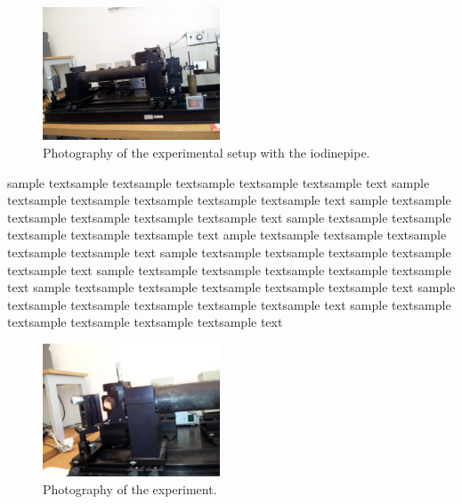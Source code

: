 \begin{figure}
  \begin{center}
    \includegraphics[width=0.47\textwidth]{pics/const2}
  \end{center}
\caption{Photography of the experimental setup with the
    iodinepipe.} 
 \label{fig:const2}

\end{figure}

sample textsample textsample textsample textsample textsample text
sample textsample textsample textsample textsample textsample text
sample textsample textsample textsample textsample textsample text
sample textsample textsample textsample textsample textsample text
ample textsample textsample textsample textsample textsample text
sample textsample textsample textsample textsample textsample text
sample textsample textsample textsample textsample textsample text
sample textsample textsample textsample textsample textsample text
sample textsample textsample textsample textsample textsample text
sample textsample textsample textsample textsample textsample text
\begin{figure}
  \begin{center}
    \includegraphics[width=0.47\textwidth]{pics/const4}
  \end{center}
\caption{Photography of the experiment.} 
  \vspace{-10pt}
 \label{fig:const4}

\end{figure}

